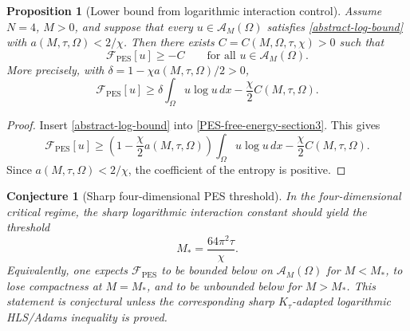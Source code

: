 \documentclass[pdflatex,sn-mathphys-num]{sn-jnl}%
\theoremstyle{thmstyleone}
\newtheorem{proposition}[theorem]{Proposition}%
\theoremstyle{thmstyletwo}
\newtheorem{conjecture}[theorem]{Conjecture}
\theoremstyle{thmstylethree}
\begin{document}
\begin{proposition}[Lower bound from logarithmic interaction control]
\label{prop:conditional-lower-bound}
Assume \(N=4\), \(M>0\), and suppose that every \(u\in\mathcal A_M(\Omega)\)
satisfies \eqref{abstract-log-bound} with
\(a(M,\tau,\Omega)<2/\chi\).  Then there exists
\(C=C(M,\Omega,\tau,\chi)>0\) such that
\begin{equation}
        \mathcal F_{\mathrm{PES}}[u]\ge -C
        \qquad
        \text{for all }u\in\mathcal A_M(\Omega).
\label{free-energy-lower-bound}
\end{equation}
More precisely, with \(\delta=1-\chi a(M,\tau,\Omega)/2>0\),
\begin{equation}
        \mathcal F_{\mathrm{PES}}[u]
        \ge
        \delta\int_\Omega u\log u\,dx
        -
        \frac{\chi}{2}C(M,\tau,\Omega).
\label{coercive-free-energy}
\end{equation}
\end{proposition}

\begin{proof}
Insert \eqref{abstract-log-bound} into
\eqref{PES-free-energy-section3}.  This gives
\[
        \mathcal F_{\mathrm{PES}}[u]
        \ge
        \left(1-\frac{\chi}{2}a(M,\tau,\Omega)\right)
        \int_\Omega u\log u\,dx
        -
        \frac{\chi}{2}C(M,\tau,\Omega).
\]
Since \(a(M,\tau,\Omega)<2/\chi\), the coefficient of the entropy is positive.
\end{proof}

\begin{conjecture}[Sharp four-dimensional PES threshold]
\label{conj:sharp-PES-threshold}
In the four-dimensional critical regime, the sharp logarithmic interaction
constant should yield the threshold
\begin{equation}
        M_*=\frac{64\pi^2\tau}{\chi}.
\label{conjectured-critical-mass}
\end{equation}
Equivalently, one expects \(\mathcal F_{\mathrm{PES}}\) to be bounded below on
\(\mathcal A_M(\Omega)\) for \(M<M_*\), to lose compactness at \(M=M_*\), and
to be unbounded below for \(M>M_*\).  This statement is conjectural unless the
corresponding sharp \(K_\tau\)-adapted logarithmic HLS/Adams inequality is
proved.
\end{conjecture}
\end{document}
